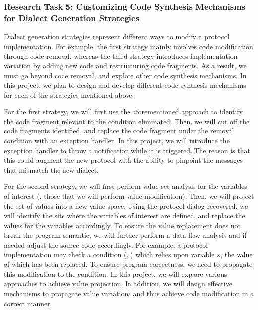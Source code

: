 {{\subsubsection{Research Task 5: Customizing Code Synthesis Mechanisms for 
Dialect Generation Strategies}

Dialect generation strategies represent different ways to modify a protocol
implementation. For example, the first strategy mainly involves code
modification through code removal, whereas the third strategy introduces
implementation variation by adding new code and restructuring code fragments. As
a result, we must  go beyond code removal, and explore other code synthesis
mechanisms. In this project, we plan to design and develop different code
synthesis mechanisms for each of the strategies mentioned above.

For the first strategy, we will first use the aforementioned approach to
identify the code fragment relevant to the condition eliminated. Then, we will
cut off the code fragments identified, and replace the code fragment under the
removal condition with an exception handler. In this project, we will introduce
the exception handler to throw a notification while it is triggered. The reason
is that this could augment the new protocol with the ability to pinpoint the
messages that mismatch the new dialect.

For the second strategy, we will first perform value set analysis for the
variables of interest (\ie, those that we will perform value modification).
Then, we will project the set of values into a new value space. Using the
protocol dialog recovered, we will identify the site where the variables of
interest are defined, and replace the values for the variables accordingly. To
ensure the value replacement does not break the program semantic, we will
further perform a data flow analysis and if needed adjust the source code
accordingly. For example, a protocol implementation may check a condition (\eg,
) which relies upon variable \texttt{x}, the value of
which has been replaced. To ensure program correctness, we need to propagate
this modification to the condition. In this project, we will explore various
approaches to achieve value projection. In addition, we will design effective
mechanisms to propagate value variations and thus achieve code modification in a
correct manner.

}}
